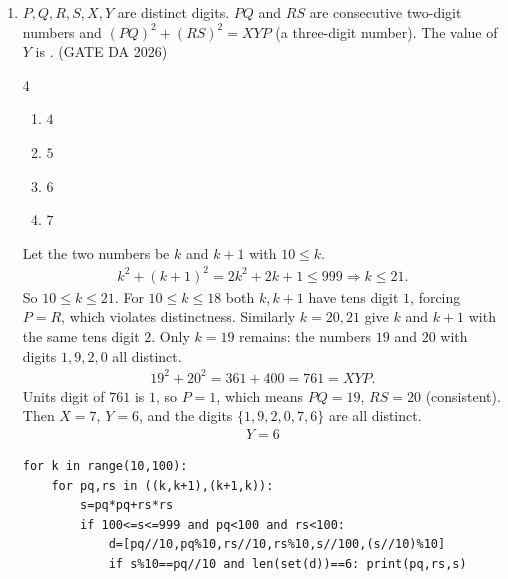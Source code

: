 \begin{enumerate}[label=\textbf{Q.\arabic*},leftmargin=*,start=1]
\item[\textbf{Q.9}] $P,Q,R,S,X,Y$ are distinct digits. $PQ$ and $RS$ are
consecutive two-digit numbers and $(PQ)^2+(RS)^2=XYP$ (a three-digit number).
The value of $Y$ is \underline{\hspace{1.5cm}}.
\hfill (GATE DA 2026)
\begin{multicols}{4}
\begin{enumerate}[label=(\alph*),itemsep=0pt]
 \item $4$ \item $5$ \item $6$ \item $7$
\end{enumerate}
\end{multicols}
\solution
Let the two numbers be $k$ and $k+1$ with $10\le k$.
\begin{align}
k^2+(k+1)^2 = 2k^2+2k+1 \le 999 \Rightarrow k\le 21 .
\end{align}
So $10\le k\le 21$. For $10\le k\le 18$ both $k,k+1$ have tens digit $1$, forcing
$P=R$, which violates distinctness. Similarly $k=20,21$ give $k$ and $k+1$ with
the same tens digit $2$. Only $k=19$ remains: the numbers $19$ and $20$ with digits
$1,9,2,0$ all distinct.
\begin{align}
19^2+20^2 = 361+400 = 761 = XYP .
\end{align}
Units digit of $761$ is $1$, so $P=1$, which means $PQ=19$, $RS=20$ (consistent).
Then $X=7$, $Y=6$, and the digits $\{1,9,2,0,7,6\}$ are all distinct.
\begin{align}
\boxed{Y=6}
\end{align}
\begin{lstlisting}
for k in range(10,100):
    for pq,rs in ((k,k+1),(k+1,k)):
        s=pq*pq+rs*rs
        if 100<=s<=999 and pq<100 and rs<100:
            d=[pq//10,pq%10,rs//10,rs%10,s//100,(s//10)%10]
            if s%10==pq//10 and len(set(d))==6: print(pq,rs,s)
\end{lstlisting}


\end{enumerate}
